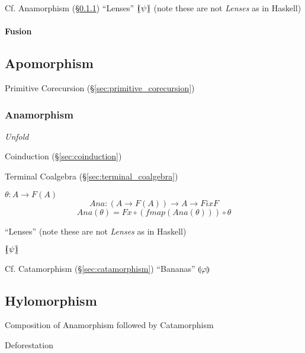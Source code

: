 \fist Cf. Anamorphism (\S\ref{sec:anamorphism}) ``Lenses'' $[\kern-1.95pt(
\psi )\kern-2.0pt]$ (note these are not \emph{Lenses} as in Haskell)


\paragraph{Fusion}\label{sec:fusion}\hfill



\subsection{Apomorphism}\label{sec:apomorphism}

Primitive Corecursion (\S\ref{sec:primitive_corecursion})



\subsubsection{Anamorphism}\label{sec:anamorphism}

\emph{Unfold}

Coinduction (\S\ref{sec:coinduction})

Terminal Coalgebra (\S\ref{sec:terminal_coalgebra})

$\theta : A \rightarrow F(A)$
\[
  Ana : (A \rightarrow F (A)) \rightarrow A \rightarrow Fix F
\]\[
  Ana (\theta) = Fx \circ (fmap (Ana (\theta))) \circ \theta
\]

``Lenses'' (note these are not \emph{Lenses} as in Haskell)

$[\kern-1.95pt( \psi )\kern-2.0pt]$

\fist Cf. Catamorphism (\S\ref{sec:catamorphism}) ``Bananas''
$\llparenthesis \varphi \rrparenthesis$



\subsection{Hylomorphism}\label{sec:hylomorphism}

Composition of Anamorphism followed by Catamorphism

Deforestation



